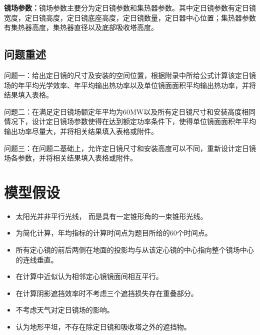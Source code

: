 \documentclass[withoutpreface,bwprint]{cumcmthesis} %
\begin{document}
\textbf{镜场参数：}镜场参数主要分为定日镜参数和集热器参数。其中定日镜参数有定日镜宽度，定日镜高度，定日镜底座高度，定日镜数量，定日器中心位置；集热器参数有集热器高度，集热器直径以及底部吸收塔高度。
\subsection{问题重述}


问题一：给出定日镜的尺寸及安装的空间位置，根据附录中所给公式计算该定日镜场的年平均光学效率、年平均输出热功率以及单位镜面面积平均输出热功率，并将结果填入表格。

问题二：在满足定日镜场额定年平均为60MW以及所有定日镜尺寸和安装高度相同情况下，设计定日镜场参数使得在达到额定功率条件下，使得单位镜面面积年平均输出功率尽量大，并将相关结果填入表格或附件。

问题三：在问题二基础上，允许定日镜尺寸和安装高度可以不同，重新设计定日镜场各参数，并将相关结果填入表格或附件。
\section{模型假设}
\begin{itemize}
	\item 太阳光并非平行光线， 而是具有一定锥形角的一束锥形光线。
	\item 为简化计算，年均指标的计算时间点为题目所给的60个时间点。
	\item 所有定心镜的前后两侧在地面的投影均与从该定心镜的中心指向整个镜场中心的连线垂直。
	\item 在计算中近似认为相邻定心镜镜面间相互平行。
	\item 在计算阴影遮挡效率时不考虑三个遮挡损失存在重叠部分。
	\item 不考虑天气对定日镜场的影响。
	\item 认为地形平坦，不存在除定日镜和吸收塔之外的遮挡物。
\end{itemize}
\end{document}
